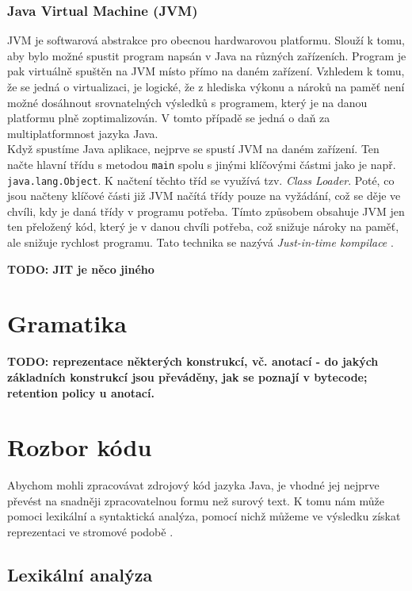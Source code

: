 			\subsubsection{Java Virtual Machine (JVM)}			
				JVM je softwarová abstrakce pro obecnou hardwarovou platformu. Slouží k tomu, aby bylo možné spustit program napsán v Java na různých zařízeních. Program je pak virtuálně spuštěn na JVM místo přímo na daném zařízení. Vzhledem k tomu, že se jedná o virtualizaci, je logické, že z hlediska výkonu a nároků na paměť není možné dosáhnout srovnatelných výsledků s programem, který je na danou platformu plně zoptimalizován. V tomto případě se jedná o daň za multiplatformnost jazyka Java.\\ 
			
			Když spustíme Java aplikace, nejprve se spustí JVM na daném zařízení. Ten načte hlavní třídu s metodou \texttt{main} spolu s jinými klíčovými částmi jako je např. \texttt{java.lang.Object}. K načtení těchto tříd se využívá tzv. \emph{Class Loader}. Poté, co jsou načteny klíčové části již JVM načítá třídy pouze na vyžádání, což se děje ve chvíli, kdy je daná třídy v programu potřeba. Tímto způsobem obsahuje JVM jen ten přeložený kód, který je v danou chvíli potřeba, což snižuje nároky na paměť, ale snižuje rychlost programu. Tato technika se nazývá \emph{Just-in-time kompilace} \cite{jit}\cite{classLoad}.
			
			\textbf{\textcolor{pblue}{TODO: JIT je něco jiného}}\\
				
	
	\section{Gramatika}
		\textbf{\textcolor{pblue}{TODO: reprezentace některých konstrukcí, vč. anotací - do jakých základních konstrukcí jsou převáděny, jak se poznají v bytecode; retention policy u anotací.	}}\\
	
	\section{Rozbor kódu}
		Abychom mohli zpracovávat zdrojový kód jazyka Java, je vhodné jej nejprve převést na snadněji zpracovatelnou formu než surový text. K tomu nám může pomoci lexikální a syntaktická analýza, pomocí nichž můžeme ve výsledku získat reprezentaci ve stromové podobě \cite{compilerTutorial}.
	
		\subsection{Lexikální analýza}
		
